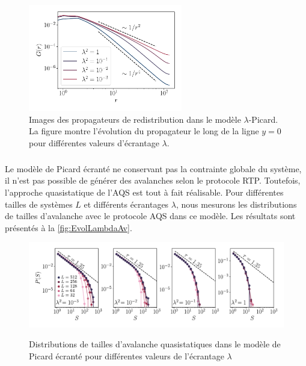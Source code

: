 \begin{figure}[h]
	\centering
	\includegraphics[width=0.6\textwidth]{Chapitre6/Figures/ScreenedPropagators.pdf}
	\caption{Images des propagateurs de redistribution dans le modèle $\lambda$-Picard. La figure montre l'évolution du propagateur le long de la ligne $y=0$ pour différentes valeurs d'écrantage $\lambda$.}
	\label{fig:screenedprop}
\end{figure}

\subparagraph{}Le modèle de Picard écranté ne conservant pas la contrainte globale du système, il n'est pas possible de générer des avalanches selon le protocole RTP. Toutefois, l'approche quasistatique de l'AQS est tout à fait réalisable. Pour différentes tailles de systèmes $L$ et différents écrantages $\lambda$, nous mesurons les distributions de tailles d'avalanche avec le protocole AQS dans ce modèle. Les résultats sont présentés à la \autoref{fig:EvolLambdaAv}.

\begin{figure}[h]
	\centering
	\includegraphics[width=\textwidth]{Chapitre4/Figures/Avalanches/EvolLambdaAv.pdf}
	\label{fig:EvolLambdaAv}
	\caption{Distributions de tailles d'avalanche quasistatiques dans le modèle de Picard écranté pour différentes valeurs de l'écrantage $\lambda$}
\end{figure}


